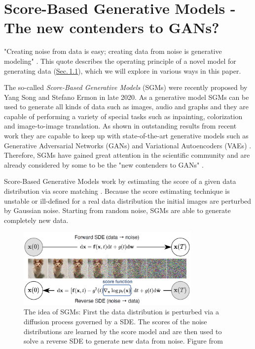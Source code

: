 \section{Score-Based Generative Models - The new contenders to GANs?} 
\thispagestyle{plain}
"Creating noise from data is easy; creating data from noise is generative modeling" \cite{score_3}. This quote describes the operating principle of a novel model for generating data (\hyperref[sec:1.1]{Sec.\,1.1}), which we will explore in various ways in this paper.

The so-called \textit{Score-Based Generative Models} (SGMs) were recently proposed by Yang Song and Stefano Ermon \cite{score_1} in late 2020. As a generative model SGMs can be used to generate all kinds of data such as images, audio and graphs and they are capable of performing a variety of special tasks such as inpainting, colorization and image-to-image translation. As shown in outstanding results from recent work \cite{score_3} they are capable to keep up with state-of-the-art generative models such as Generative Adversarial Networks (GANs) \cite{gan_original} and Variational Autoencoders (VAEs) \cite{vae_original}. Therefore, SGMs have gained great attention in the scientific community and are already considered by some to be the "new contenders to GANs" \cite{blog}.

\thispagestyle{plain}
Score-Based Generative Models work by estimating the score of a given data distribution via score matching \cite{score_matching_original}. Because the score estimating technique is unstable or ill-defined for a real data distribution the initial images are perturbed by Gaussian noise. Starting from random noise, SGMs are able to generate completely new data.

\thispagestyle{plain}
%
\begin{figure}[]
    \centering
    \includegraphics[width=0.8\textwidth]{Chapters/figures/sgm.PNG}
    \caption[The idea of Score-Based Generative Models]{The idea of SGMs: First the data distribution is perturbed via a diffusion process governed by a SDE. The scores of the noise distributions are learned by the score model and are then used to solve a reverse SDE to generate new data from noise. Figure from \cite{score_3}}
\end{figure}
%

